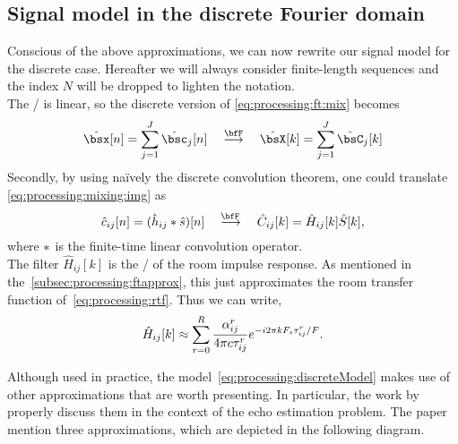 \subsection{Signal model in the discrete Fourier domain}
Conscious of the above approximations, we can now rewrite our signal model for the discrete case.
Hereafter we will always consider finite-length sequences and the index $N$ will be dropped to lighten the notation.
\\The \DFT/ is linear, so the discrete version of \cref{eq:processing:ft:mix} becomes
\begin{equation}\label{eq:processing:dft:mix}
    \hat{\mics}[ n] = \sum_{\idxSrc=1}^{\numSrcs} \hat{\imgs}_\idxSrc[ n]
    \mathspace\overset{\discreteFT}{\kto}\mathspace
    \hat{\MICS}[ k] = \sum_{\idxSrc=1}^{\numSrcs} \hat{\IMGS}_\idxSrc[ k]
\end{equation}
Secondly, by using na\"ively the discrete convolution theorem, one could translate \cref{eq:processing:mixing:img} as
\begin{equation}\label{eq:processing:discreteModel}
    \hat{\img}_{ij}[n] = (\hat{\rir}_{ij} \convDis \hat{\src})[n]
    \mathspace\overset{\discreteFT{}}{\kto}\mathspace
    \hat{C}_{ij}[k] = \hat{H}_{ij}[k] \hat{S}[k]
    ,
\end{equation}
where $\ast$ is the finite-time linear convolution operator.
\\The filter $\hat{H}_{ij}[k]$ is the \DFT/ of the room impulse response.
As mentioned in the~\cref{subsec:processing:ftapprox}, this just approximates the room transfer function of~\cref{eq:processing:rtf}.
Thus we can write,
\begin{equation}\label{eq:processing:discreteModel:rir}
    \hat{H}_{ij}[ k] \approx \sum_{r=0}^{R}
                \frac{\alpha_{ij}^r}{4 \pi c \tau_{ij}^r}
                {e}^{- {i} 2 \pi k F_s \tau_{ij}^r / F}
    .
\end{equation}

\mynewline
Although used in practice, the model~\eqref{eq:processing:discreteModel} makes use of other approximations that are worth presenting.
In particular, the work by~ properly discuss them in the context of the echo estimation problem.
The paper mention three approximations, which are depicted in the following diagram.

